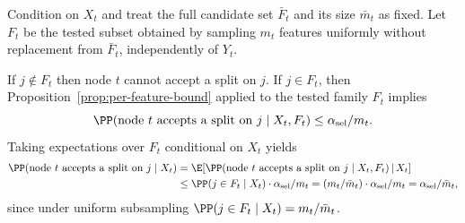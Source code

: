 Condition on $X_t$ and treat the full candidate set $\bar F_t$ and its size
$\bar m_t$ as fixed. Let $F_t$ be the tested subset obtained by sampling $m_t$
features uniformly without replacement from $\bar F_t$, independently of $Y_t$.

If $j \notin F_t$ then node $t$ cannot accept a split on $j$. If $j \in F_t$, then
Proposition~\ref{prop:per-feature-bound} applied to the tested family $F_t$
implies
%
\begin{equation}
  \PP(\text{node $t$ accepts a split on $j$} \mid X_t,F_t) \le \alpha_{\mathrm{sel}}/m_t.
\end{equation}
%
Taking expectations over $F_t$ conditional on $X_t$ yields
%
\begin{equation}
  \begin{aligned}
    \PP(\text{node $t$ accepts a split on $j$} \mid X_t)
    &= \E\!\left[\PP(\text{node $t$ accepts a split on $j$} \mid X_t,F_t)\,\middle|\, X_t\right] \\
    &\le \PP(j \in F_t \mid X_t)\cdot \alpha_{\mathrm{sel}}/m_t
    = (m_t/\bar m_t)\cdot \alpha_{\mathrm{sel}}/m_t
    = \alpha_{\mathrm{sel}}/\bar m_t,
  \end{aligned}
\end{equation}
%
since under uniform subsampling $\PP(j \in F_t \mid X_t) = m_t/\bar m_t$.
